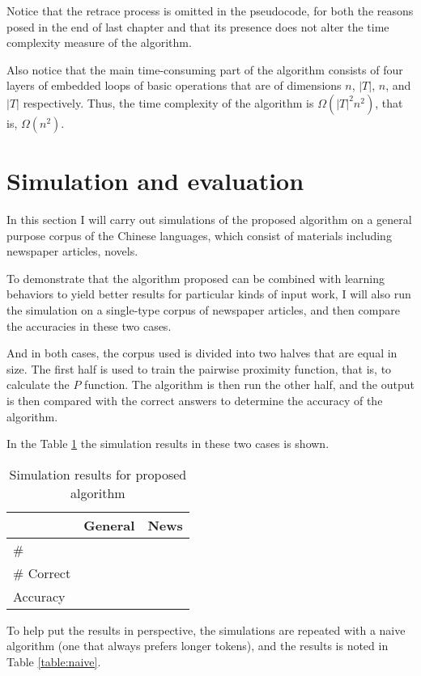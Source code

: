 \documentclass[a4paper,11pt,twocolumn]{article}
\begin{document}
Notice that the retrace process is omitted in the pseudocode, for both the reasons posed in the end of last chapter and that its presence does not alter the time complexity measure of the algorithm.

Also notice that the main time-consuming part of the algorithm consists of four layers of embedded loops of basic operations that are of dimensions $n$, $|T|$, $n$, and $|T|$ respectively. Thus, the time complexity of the algorithm is $\Omega(|T|^2n^2)$, that is, $\Omega(n^2)$.

\section{Simulation and evaluation}

In this section I will carry out simulations of the proposed algorithm on a general purpose corpus of the Chinese languages, which consist of materials including newspaper articles, novels.

To demonstrate that the algorithm proposed can be combined with learning behaviors to yield better results for particular kinds of input work, I will also run the simulation on a single-type corpus of newspaper articles, and then compare the accuracies in these two cases.

And in both cases, the corpus used is divided into two halves that are equal in size. The first half is used to train the pairwise proximity function, that is, to calculate the $P$ function. The algorithm is then run the other half, and the output is then compared with the correct answers to determine the accuracy of the algorithm.

In the Table \ref{table:algo} the simulation results in these two cases is shown.

\begin{table}[h]
\centering
\begin{tabular}{@{}lll@{}}
\toprule
           & General & News \\ \midrule
\#         &         &      \\
\# Correct &         &      \\
Accuracy   &         &      \\ \bottomrule
\end{tabular}
\caption{Simulation results for proposed algorithm}
\label{table:algo}
\end{table}

To help put the results in perspective, the simulations are repeated with a naive algorithm (one that always prefers longer tokens), and the results is noted in Table \ref{table:naive}.
\end{document}
